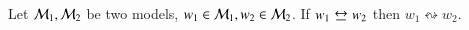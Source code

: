 \begin{thm}\label{bisim}
Let $\mathcal{M}_1,\mathcal{M}_2$ be two models, $w_1 \in \mathcal{M}_1, w_2 \in
\mathcal{M}_2$. If $w_1 \bisim w_2$ then $w_1 \leftrightsquigarrow w_2$.
\end{thm}

% 
% 
% 
% 
% 
% 
% 
% 
% 
% 

